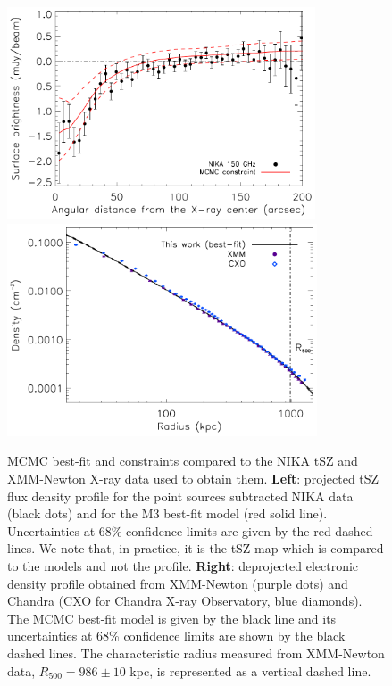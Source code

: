 \documentclass[twocolumn,traditabstract]{aa}
\begin{document}
\begin{figure}[h]
\centering
\includegraphics[height=6.3cm]{Figure/MACSJ1424_profile_ML.pdf}
\includegraphics[height=6.3cm]{Figure/ICM_density_profile.pdf}
\caption{MCMC best-fit and constraints compared to the NIKA tSZ and XMM-Newton X-ray data used to obtain them. {\bf Left}: projected tSZ flux density profile for the point sources subtracted NIKA data (black dots) and for the M3 best-fit model (red solid line). Uncertainties at 68\% confidence limits are given by the red dashed lines. We note that, in practice, it is the tSZ map which is compared to the models and not the profile. {\bf Right}: deprojected electronic density profile obtained from XMM-Newton (purple dots) and Chandra (CXO for Chandra X-ray Observatory, blue diamonds). The MCMC best-fit model is given by the black line and its uncertainties at 68\% confidence limits are shown by the black dashed lines. The characteristic radius measured from XMM-Newton data, $R_{500} = 986 \pm 10$ kpc, is represented as a vertical dashed line.}
\label{fig:MACSJ1424_MCMC_vs_data}
\end{figure}
\end{document}

